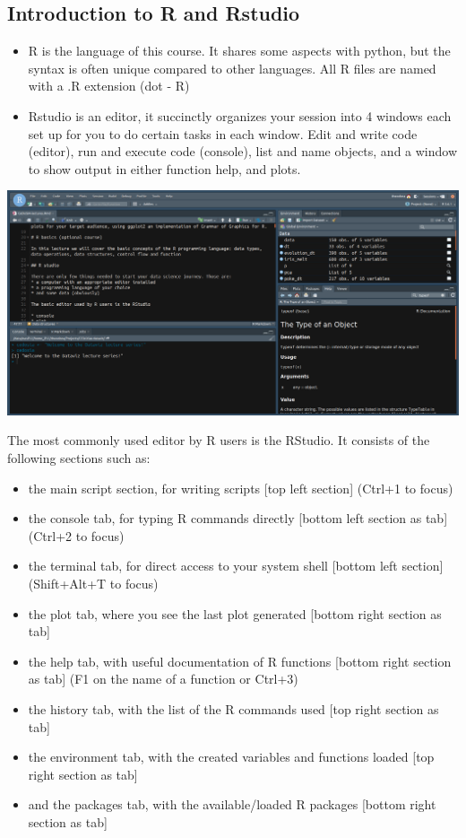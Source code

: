 \documentclass[
]{article}
\providecommand{\tightlist}{%
  \setlength{\itemsep}{0pt}\setlength{\parskip}{0pt}}
\begin{document}
\hypertarget{introduction-to-r-and-rstudio}{%
\subsection{Introduction to R and
Rstudio}\label{introduction-to-r-and-rstudio}}

\begin{itemize}
\tightlist
\item
  R is the language of this course. It shares some aspects with python,
  but the syntax is often unique compared to other languages. All R
  files are named with a .R extension (dot - R)\\
\item
  Rstudio is an editor, it succinctly organizes your session into 4
  windows each set up for you to do certain tasks in each window. Edit
  and write code (editor), run and execute code (console), list and name
  objects, and a window to show output in either function help, and
  plots.
\end{itemize}

\includegraphics[width=900px]{assets/img/RStudio}

The most commonly used editor by R users is the RStudio. It consists of
the following sections such as:

\begin{itemize}
\tightlist
\item
  the main script section, for writing scripts {[}top left section{]}
  (Ctrl+1 to focus)
\item
  the console tab, for typing R commands directly {[}bottom left section
  as tab{]} (Ctrl+2 to focus)
\item
  the terminal tab, for direct access to your system shell {[}bottom
  left section{]} (Shift+Alt+T to focus)
\item
  the plot tab, where you see the last plot generated {[}bottom right
  section as tab{]}
\item
  the help tab, with useful documentation of R functions {[}bottom right
  section as tab{]} (F1 on the name of a function or Ctrl+3)
\item
  the history tab, with the list of the R commands used {[}top right
  section as tab{]}
\item
  the environment tab, with the created variables and functions loaded
  {[}top right section as tab{]}
\item
  and the packages tab, with the available/loaded R packages {[}bottom
  right section as tab{]}
\end{itemize}
\end{document}

